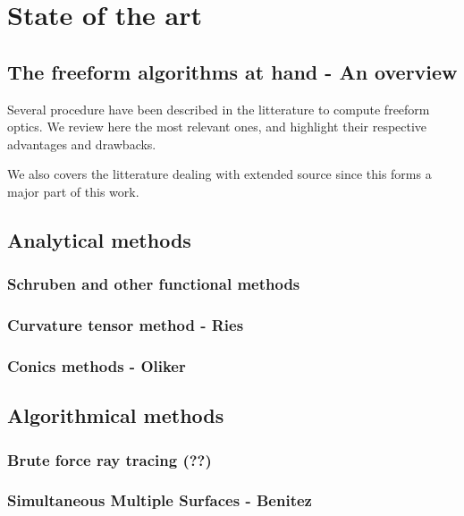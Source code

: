 \chapter{State of the art}
\label{ch:soa}

\section{The freeform algorithms at hand - An overview}
Several procedure have been described in the litterature to compute 
freeform optics. We review here the most relevant ones, and highlight
their respective advantages and drawbacks.

We also covers the litterature dealing with extended source since this 
forms a major part of this work.

\section{Analytical methods}
\subsection{Schruben and other functional methods}

\subsection{Curvature tensor method - Ries}

\subsection{Conics methods - Oliker}

\section{Algorithmical methods}
\subsection{Brute force ray tracing (??) }
\subsection{Simultaneous Multiple Surfaces - Benitez}




